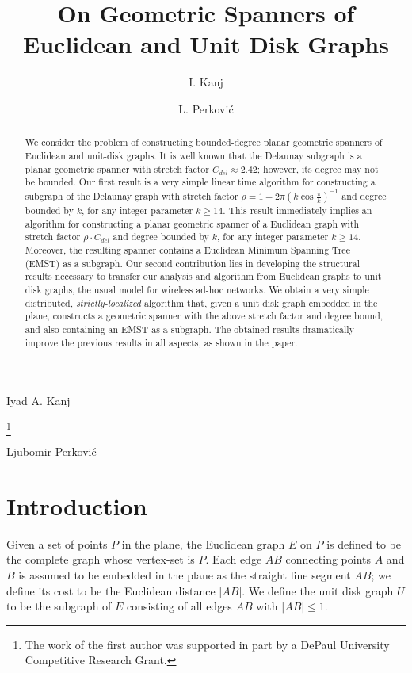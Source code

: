 \documentclass{stacs_proc}
\theoremstyle{plain}\newtheorem{satz}[thm]{Satz}
\begin{document}
\title{On Geometric Spanners of Euclidean and Unit Disk Graphs}
\author[]{I. Kanj}{Iyad A. Kanj}
\address[]{DePaul University, Chicago, IL 60604, USA.}
\thanks{The work of the first author was supported in part by a DePaul
University Competitive Research Grant.}

\author[]{L. Perkovi\'{c}}{Ljubomir Perkovi\'{c}}


\begin{abstract}
  \noindent We consider the problem of constructing bounded-degree planar
geometric spanners of Euclidean and unit-disk graphs. It is well known that
the Delaunay subgraph is a planar geometric spanner with stretch
factor $C_{del}\approx 2.42$; however, its degree may not be
bounded. Our first result is a very simple linear time
algorithm for constructing a subgraph of the Delaunay graph with
stretch factor $\rho =1+2\pi(k\cos{\frac{\pi}{k}})^{-1}$ and degree
bounded by $k$, for any integer parameter $k\geq 14$. This result
immediately implies an algorithm for constructing a planar geometric
spanner of a Euclidean graph with stretch factor $\rho \cdot
C_{del}$ and degree bounded by $k$, for any integer parameter $k\geq
14$. Moreover, the resulting spanner contains a Euclidean Minimum Spanning Tree
(EMST) as a subgraph. Our second contribution lies in developing the structural
results necessary to transfer our analysis and algorithm from
Euclidean graphs to unit disk graphs, the usual model for wireless ad-hoc
networks. We obtain a very simple distributed, {\em strictly-localized}
algorithm that, given a unit disk graph embedded in the plane, constructs a 
geometric spanner with the above stretch factor and degree bound, and also
containing an EMST as a subgraph.  The obtained results
dramatically improve the previous results in all aspects, as shown
in the paper. 
\end{abstract}

\maketitle


\section*{Introduction} \label{intro}
Given a set of points $P$ in the plane, the Euclidean graph $E$ on
$P$ is defined to be the complete graph whose vertex-set is $P$.
Each edge $AB$ connecting points $A$ and $B$ is assumed to be
embedded in the plane as the straight line segment $AB$; we define
its cost to be the Euclidean distance $|AB|$. We
define the unit disk graph $U$ to be the subgraph of $E$ consisting
of all edges $AB$ with $|AB| \leq 1$.
\end{document}

